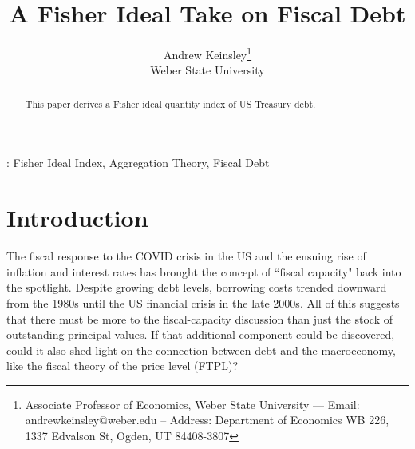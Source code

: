 \documentclass[11pt,a4paper,margin=1.5in]{article}
\title{A Fisher Ideal Take on Fiscal Debt}
\author{Andrew Keinsley\thanks{Associate Professor of Economics, Weber State University --- Email: andrewkeinsley@weber.edu -- Address: Department of Economics WB 226, 1337 Edvalson St, Ogden, UT 84408-3807 } \\  {\small Weber State University}}
\begin{document}
\maketitle
\thispagestyle{empty}

\begin{abstract}
\noindent This paper derives a Fisher ideal quantity index of US Treasury debt.

\end{abstract}
\vspace{2em}

: Fisher Ideal Index, Aggregation Theory, Fiscal Debt
\newpage
\setcounter{page}{1}


\section{Introduction}

The fiscal response to the COVID crisis in the US and the ensuing rise of inflation and interest rates has brought the concept of ``fiscal capacity" back into the spotlight. 
Despite growing debt levels, borrowing costs trended downward from the 1980s until the US financial crisis in the late 2000s.
All of this suggests that there must be more to the fiscal-capacity discussion than just the stock of outstanding principal values.
If that additional component could be discovered, could it also shed light on the connection between debt and the macroeconomy, like the fiscal theory of the price level (FTPL)?
\end{document}
